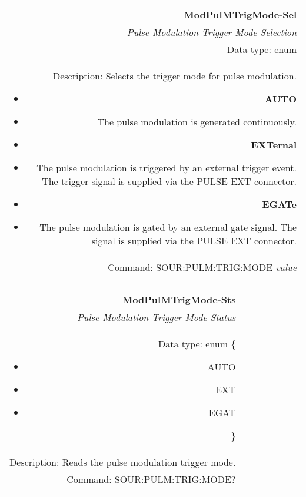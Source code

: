 \documentclass[openany]{article}
\begin{document}
		\begin{tabular}{N}
			\hline
			\bfseries ModPulMTrigMode-Sel \\ \hline
			\emph{Pulse Modulation Trigger Mode Selection} \\
			Data type: enum \\  
			Description: Selects the trigger mode for pulse modulation. \begin{itemize}[noitemsep]
				\small
				\item[] \textbf{AUTO}
                                \item[] The pulse modulation is generated continuously.
                                \item[] \textbf{EXTernal}
                                \item[] The pulse modulation is triggered by an external trigger event. The trigger signal is supplied via the PULSE EXT connector.
				\item[] \textbf{EGATe}
				\item[] The pulse modulation is gated by an external gate signal. The signal is supplied via the PULSE EXT connector.
			\end{itemize} \\
			Command: SOUR:PULM:TRIG:MODE \emph{value} \\
			\\

		\end{tabular}


		\begin{tabular}{N}
			\hline
			\bfseries ModPulMTrigMode-Sts \\ \hline
			\emph{Pulse Modulation Trigger Mode Status} \\
			Data type: enum \{\begin{itemize}[noitemsep]
				\small
				\item[] AUTO
				\item[] EXT
				\item[] EGAT
			\end{itemize}\} \\ 
			Description: Reads the pulse modulation trigger mode. \\
			Command: SOUR:PULM:TRIG:MODE? \\
			\\

		\end{tabular}
\end{document}
